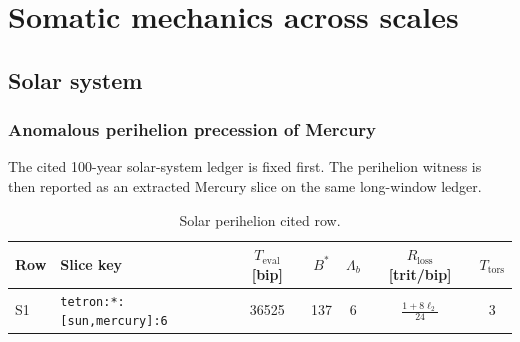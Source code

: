\section{Somatic mechanics across scales}
\subsection{Solar system}

\subsubsection{Anomalous perihelion precession of Mercury}
\label{man:solar-perihelion-witness}

The cited 100-year solar-system ledger is fixed first. The perihelion witness is then reported as an extracted Mercury slice on the same long-window ledger.\par\smallskip
{}

\begin{table}[H]
\centering
\caption{Solar perihelion cited row.}
\label{tab:solar-perihelion-row}
\begin{threeparttable}
\small
\begin{tabularx}{\linewidth}{@{}lXccccc@{}}
\toprule
Row & Slice key & $T_{\mathrm{eval}}$ [bip] & $B^*$ & $\Lambda_b$ & $R_{\mathrm{loss}}$ [trit/bip] & $T_{\mathrm{tors}}$ \\
\midrule
S1 & \texttt{tetron:*:[sun,mercury]:6} & 36525 & 137 & 6 & $\frac{1+8\ell_2}{24}$ & 3 \\
\bottomrule
\end{tabularx}
\end{threeparttable}
\end{table}

